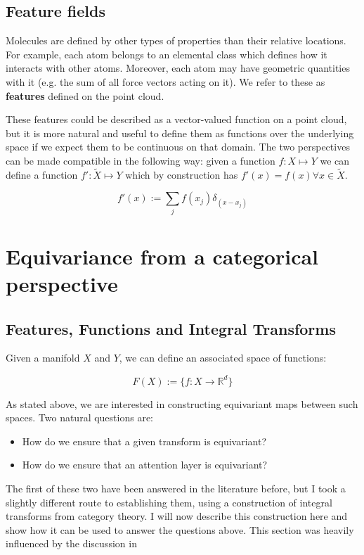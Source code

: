\documentclass[11pt]{article}
\begin{document}
\subsection{Feature fields}
Molecules are defined by other types of properties than their relative locations. For example, each atom belongs to an elemental class which defines how it interacts with other atoms. Moreover, each atom may have geometric quantities with it (e.g. the sum of all force vectors acting on it). We refer to these as \textbf{features} defined on the point cloud.

These features could be described as a vector-valued function on a point cloud, but it is more natural and useful to define them as functions over the underlying space if we expect them to be continuous on that domain. The two perspectives can be made compatible in the following way: given a function $f: X \mapsto Y$ we can define a function $f': \tilde{X} \mapsto Y$ which by construction has $f'(x) = f(x) \forall x \in \tilde{X}$.

$$ f'(x) := \sum_j f(x_j)\delta_(x - x_j)$$

\section{Equivariance from a categorical perspective}

\subsection*{Features, Functions and Integral Transforms}

Given a manifold $X$ and $Y$, we can define an associated space of functions:

$$ F(X) := \{ f: X \rightarrow \mathbb{R}^d \}$$

As stated above, we are interested in constructing equivariant maps between such spaces. Two natural questions are:

\begin{itemize}
    \item How do we ensure that a given transform is equivariant?
    \item How do we ensure that an attention layer is equivariant?
\end{itemize}

The first of these two have been answered in the literature before, but I took a slightly different route to establishing them, using a construction of integral transforms from category theory. I will now describe this construction here and show how it can be used to answer the questions above. This section was heavily influenced by the discussion in \cite{integral_transforms}
\end{document}
